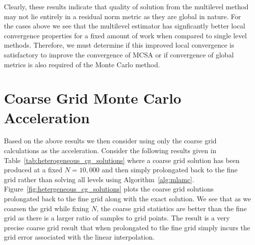 \documentclass[note]{TechNote}
\begin{document}
Clearly, these results indicate that quality of solution from the
multilevel method may not lie entirely in a residual norm metric as
they are global in nature. For the cases above we see that the
multilevel estimator has signficantly better local convergence
properties for a fixed amount of work when compared to single level
methods. Therefore, we must determine if this improved local
convergence is satisfactory to improve the convergence of MCSA or if
convergence of global metrics is also required of the Monte Carlo
method.

\section{Coarse Grid Monte Carlo Acceleration}
Based on the above results we then consider using only the coarse grid
calculations as the acceleration. Consider the following results given
in Table~\ref{tab:heterogeneous_cg_solutions} where a coarse grid
solution has been produced at a fixed $N=10,000$ and then simply
prolongated back to the fine grid rather than solving all levels using
Algorithm~\ref{alg:mlamc}. Figure~\ref{fig:hetergeneous_cg_solutions}
plots the coarse grid solutions prolongated back to the fine grid
along with the exact solution. We see that as we coarsen the grid
while fixing $N$, the coarse grid statistics are better than the fine
grid as there is a larger ratio of samples to grid points. The result
is a very precise coarse grid result that when prolongated to the fine
grid simply incurs the grid error associated with the linear
interpolation.
\end{document}
